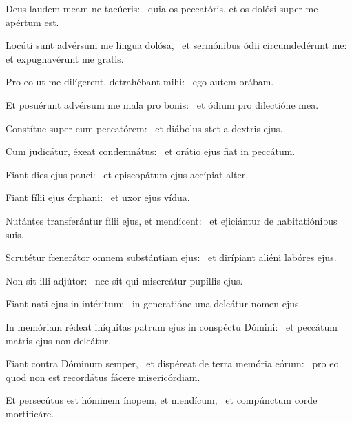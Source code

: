 \item Deus laudem meam ne tacúeris:~\psstar{} quia os peccatóris, et os dolósi super me apértum est.

\item Locúti sunt advérsum me lingua dolósa,~\pscross{} et sermónibus ódii circumdedérunt me:~\psstar{} et expugnavérunt me gratis.

\item Pro eo ut me dilígerent, detrahébant mihi:~\psstar{} ego autem orábam.

\item Et posuérunt advérsum me mala pro bonis:~\psstar{} et ódium pro dilectióne mea.

\item Constítue super eum peccatórem:~\psstar{} et diábolus stet a dextris ejus.

\item Cum judicátur, éxeat condemnátus:~\psstar{} et orátio ejus fiat in peccátum.

\item Fiant dies ejus pauci:~\psstar{} et episcopátum ejus accípiat alter.

\item Fiant fílii ejus órphani:~\psstar{} et uxor ejus vídua.

\item Nutántes transferántur fílii ejus, et mendícent:~\psstar{} et ejiciántur de habitatiónibus suis.

\item Scrutétur fœnerátor omnem substántiam ejus:~\psstar{} et dirípiant aliéni labóres ejus.

\item Non sit illi adjútor:~\psstar{} nec sit qui misereátur pupíllis ejus.

\item Fiant nati ejus in intéritum:~\psstar{} in generatióne una deleátur nomen ejus.

\item In memóriam rédeat iníquitas patrum ejus in conspéctu Dómini:~\psstar{} et peccátum matris ejus non deleátur.

\item Fiant contra Dóminum semper,~\pscross{} et dispéreat de terra memória eórum:~\psstar{} pro eo quod non est recordátus fácere misericórdiam.

\item Et persecútus est hóminem ínopem, et mendícum,~\psstar{} et compúnctum corde mortificáre.

